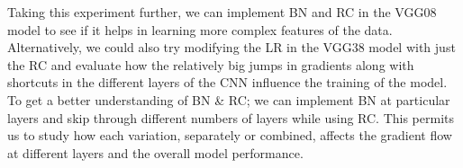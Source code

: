 {{Taking this experiment further, we can implement BN and RC in the VGG08 model to see if it helps in learning more complex features of the data. Alternatively, we could also try modifying the LR in the VGG38 model with just the RC and evaluate how the relatively big jumps in gradients along with shortcuts in the different layers of the CNN influence the training of the model. 
To get a better understanding of BN \& RC; we can implement BN at particular layers and skip through different numbers of layers while using RC. This permits us to study how each variation, separately or combined, affects the gradient flow at different layers and the overall model performance.}
}


